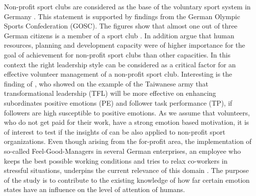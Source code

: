 \documentclass[	
	12pt, %
	a4paper, %
  abstracton
]{scrartcl}\usepackage[]{graphicx}\usepackage[]{color}
\begin{document}
Non-profit sport clubs are considered as the base of the voluntary sport system in Germany \cite{Wicker2011}. This statement is supported by findings from the German Olympic Sports Confederation (GOSC). The figures show that almost one out of three German citizens is a member of a sport club \cite{GOSC2009}. In addition  argue that human resources, planning and development capacity were of higher importance for the goal of achievement for non-profit sport clubs than other capacities. In this context the right leadership style can be considered as a critical factor for an effective volunteer management of a non-profit sport club. Interesting is the finding of , who showed on the example of the Taiwanese army that transformational leadership (TFL) will be more effective on enhancing subordinates positive emotions (PE) and follower task performance (TP), if followers are high susceptible to positive emotions. As we assume that volunteers, who do not get paid for their work, have a strong emotion based motivation, it is of interest to test if the insights of  can be also applied to non-profit sport organizations. Even though arising from the for-profit area, the implementation of so-called Feel-Good-Managers in several German enterprises, an employee who keeps the best possible working conditions and tries to relax co-workers in stressful situations, underpins the current relevance of this domain \cite{Maas2013}. The purpose of the study is to contribute to the existing knowledge of how far certain emotion states have an influence on the level of attention of humans.


\end{document}
